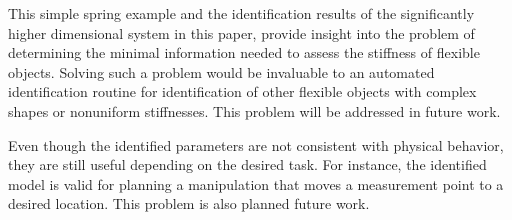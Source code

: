 \documentclass[runningheads,a4paper]{llncs}
\begin{document}
This simple spring example and the identification results of the significantly higher dimensional system in this paper, provide insight into the problem of determining the minimal information needed to assess the stiffness of flexible objects.  Solving such a problem would be invaluable to an automated identification routine for identification of other flexible objects with complex shapes or nonuniform stiffnesses. This problem will be addressed in future work.

Even though the identified parameters are not consistent with physical behavior, they are still useful depending on the desired task. For instance, the identified model is valid for planning a manipulation that moves a measurement point to a desired location.  This problem is also planned future work.


\end{document}
